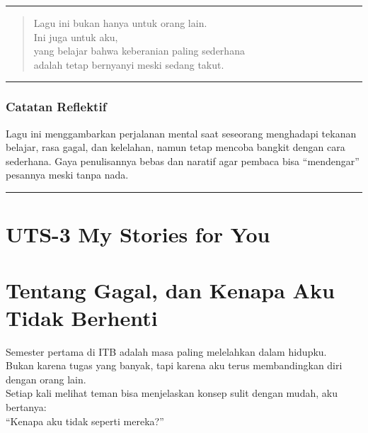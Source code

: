 \documentclass[
  letterpaper,
  DIV=11,
  numbers=noendperiod]{scrreprt}
\begin{document}
\begin{center}\rule{0.5\linewidth}{0.5pt}\end{center}

\begin{quote}
Lagu ini bukan hanya untuk orang lain.\\
Ini juga untuk aku,\\
yang belajar bahwa keberanian paling sederhana\\
adalah tetap bernyanyi meski sedang takut.
\end{quote}

\begin{center}\rule{0.5\linewidth}{0.5pt}\end{center}

\subsection{Catatan Reflektif}\label{catatan-reflektif}

Lagu ini menggambarkan perjalanan mental saat seseorang menghadapi
tekanan belajar, rasa gagal, dan kelelahan, namun tetap mencoba bangkit
dengan cara sederhana. Gaya penulisannya bebas dan naratif agar pembaca
bisa ``mendengar'' pesannya meski tanpa nada.

\begin{center}\rule{0.5\linewidth}{0.5pt}\end{center}


\chapter{UTS-3 My Stories for You}\label{uts-3-my-stories-for-you}


\chapter{Tentang Gagal, dan Kenapa Aku Tidak
Berhenti}\label{tentang-gagal-dan-kenapa-aku-tidak-berhenti}

Semester pertama di ITB adalah masa paling melelahkan dalam hidupku.\\
Bukan karena tugas yang banyak, tapi karena aku terus membandingkan diri
dengan orang lain.\\
Setiap kali melihat teman bisa menjelaskan konsep sulit dengan mudah,
aku bertanya:\\
``Kenapa aku tidak seperti mereka?''
\end{document}
